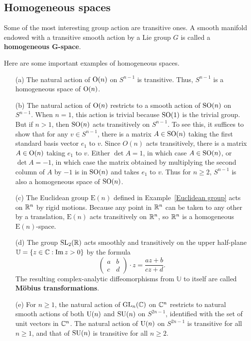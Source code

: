 \subsection{Homogeneous spaces}
Some of the most interesting group action are transitive ones. A smooth manifold
endowed with a transitive smooth action by a Lie group $G$ is called a \textbf{homogeneous $\bm{G}$-space}.\par
Here are some important examples of homogeneous spaces.
\begin{example}
\mbox{}
\begin{itemize}
\item[(a)] The natural action of $\mathrm{O}(n)$ on $S^{n-1}$ is transitive. Thus, $S^{n-1}$ is a homogeneous space of $\mathrm{O}(n)$.
\item[(b)] The natural action of $\mathrm{O}(n)$ restricts to a smooth action of $\mathrm{SO}(n)$ on $S^{n-1}$. When $n=1$, this action is trivial because $\mathrm{SO}(1)$ is the trivial group. But if $n>1$, then $\mathrm{SO}(n)$ acts transitively on $S^{n-1}$. To see this, it suffices to show that for any $v\in S^{n-1}$, there is a matrix $A\in\mathrm{SO}(n)$ taking the first standard basis vector $e_1$ to $v$. Since $O(n)$ acts transitively, there is a matrix $A\in\mathrm{O}(n)$ taking $e_1$ to $v$. Either $\det A=1$, in which case $A\in\mathrm{SO}(n)$, or $\det A=-1$, in which case the matrix obtained by multiplying the second column of $A$ by $-1$ is in $\mathrm{SO}(n)$ and takes $e_1$ to $v$. Thus for $n\geq2$, $S^{n-1}$ is also a homogeneous space of $\mathrm{SO}(n)$.
\item[(c)] The Euclidean group $\mathrm{E}(n)$ defined in Example~\ref{Euclidean group} acts on $\mathbb{R}^n$ by rigid motions. Because any point in $\mathbb{R}^n$ can be taken to any other by a translation, $\mathrm{E}(n)$ acts transitively on $\mathbb{R}^n$, so $\mathbb{R}^n$ is a homogeneous $\mathrm{E}(n)$-space.
\item[(d)] The group $\mathrm{SL}_2(\mathbb{R})$ acts smoothly and transitively on the upper half-plane $\mathbb{U}=\{z\in\mathbb{C}:\mathrm{Im}\,z>0\}$ by the formula
\[\begin{pmatrix}
a&b\\
c&d
\end{pmatrix}\cdot z=\frac{az+b}{cz+d}.\]
The resulting complex-analytic diffeomorphisms from $\mathbb{U}$ to itself are called \textbf{M\"obius transformations}.
\item[(e)] For $n\geq1$, the natural action of $\mathrm{GL}_n(\mathbb{C})$ on $\mathbb{C}^n$ restricts to natural smooth actions of both $\mathrm{U}(n)$ and $\mathrm{SU}(n)$ on $S^{2n-1}$, identified with the set of unit vectors in $\mathbb{C}^n$. The natural action of $\mathrm{U}(n)$ on $S^{2n-1}$ is transitive for all $n\geq1$, and that of $\mathrm{SU}(n)$ is transitive for all $n\geq2$.
\end{itemize}
\end{example}
